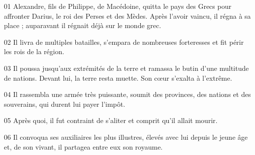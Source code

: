 01 Alexandre, fils de Philippe, de Macédoine, quitta le pays des Grecs pour affronter Darius, le roi des Perses et des Mèdes. Après l’avoir vaincu, il régna à sa place ; auparavant il régnait déjà sur le monde grec.

02 Il livra de multiples batailles, s’empara de nombreuses forteresses et fit périr les rois de la région.

03 Il poussa jusqu’aux extrémités de la terre et ramassa le butin d’une multitude de nations. Devant lui, la terre resta muette. Son cœur s’exalta à l’extrême.

04 Il rassembla une armée très puissante, soumit des provinces, des nations et des souverains, qui durent lui payer l’impôt.

05 Après quoi, il fut contraint de s’aliter et comprit qu’il allait mourir.

06 Il convoqua ses auxiliaires les plus illustres, élevés avec lui depuis le jeune âge et, de son vivant, il partagea entre eux son royaume.
